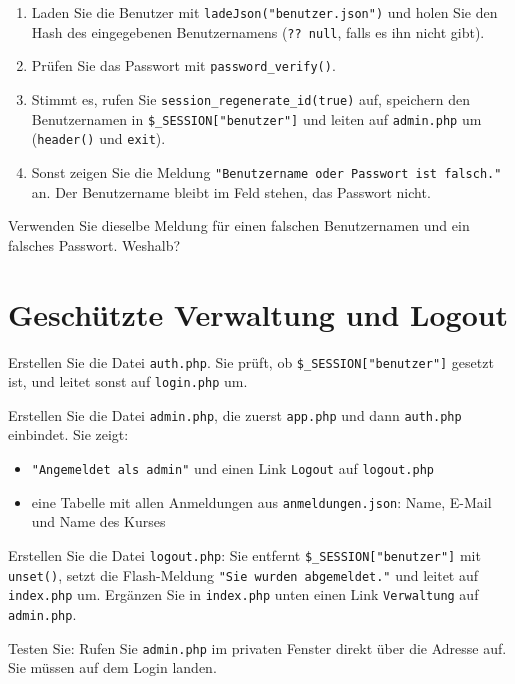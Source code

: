 \documentclass[a4paper,12pt]{article}
\begin{document}
\begin{enumerate}
    \item Laden Sie die Benutzer mit \texttt{ladeJson("{}benutzer.json"{})} und holen Sie den Hash des eingegebenen Benutzernamens (\texttt{?? null}, falls es ihn nicht gibt).
    \item Prüfen Sie das Passwort mit \texttt{password\_verify()}.
    \item Stimmt es, rufen Sie \texttt{session\_regenerate\_id(true)} auf, speichern den Benutzernamen in \texttt{\$\_SESSION["{}benutzer"{}]} und leiten auf \texttt{admin.php} um (\texttt{header()} und \texttt{exit}).
    \item Sonst zeigen Sie die Meldung \texttt{"{}Benutzername oder Passwort ist falsch."{}} an. Der Benutzername bleibt im Feld stehen, das Passwort nicht.
\end{enumerate}

Verwenden Sie dieselbe Meldung für einen falschen Benutzernamen und ein falsches Passwort. Weshalb?

\section{Geschützte Verwaltung und Logout}

Erstellen Sie die Datei \texttt{auth.php}. Sie prüft, ob \texttt{\$\_SESSION["{}benutzer"{}]} gesetzt ist, und leitet sonst auf \texttt{login.php} um.

Erstellen Sie die Datei \texttt{admin.php}, die zuerst \texttt{app.php} und dann \texttt{auth.php} einbindet. Sie zeigt:

\begin{itemize}
    \item \texttt{"{}Angemeldet als admin"{}} und einen Link \texttt{Logout} auf \texttt{logout.php}
    \item eine Tabelle mit allen Anmeldungen aus \texttt{anmeldungen.json}: Name, E-Mail und Name des Kurses
\end{itemize}

Erstellen Sie die Datei \texttt{logout.php}: Sie entfernt \texttt{\$\_SESSION["{}benutzer"{}]} mit \texttt{unset()}, setzt die Flash-Meldung \texttt{"{}Sie wurden abgemeldet."{}} und leitet auf \texttt{index.php} um. Ergänzen Sie in \texttt{index.php} unten einen Link \texttt{Verwaltung} auf \texttt{admin.php}.

Testen Sie: Rufen Sie \texttt{admin.php} im privaten Fenster direkt über die Adresse auf. Sie müssen auf dem Login landen.
\end{document}
